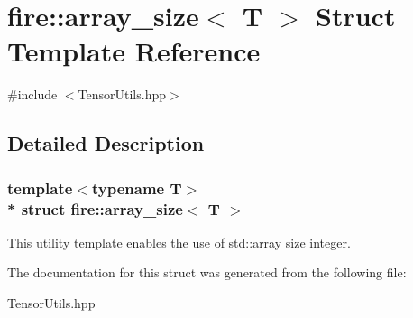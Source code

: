 \hypertarget{a00035}{}\section{fire\+:\+:array\+\_\+size$<$ T $>$ Struct Template Reference}
\label{a00035}


{\ttfamily \#include $<$Tensor\+Utils.\+hpp$>$}



\subsection{Detailed Description}
\subsubsection*{template$<$typename T$>$\\*
struct fire\+::array\+\_\+size$<$ T $>$}

This utility template enables the use of std\+::array size integer. 

The documentation for this struct was generated from the following file\+:\begin{DoxyCompactItemize}
\item 
Tensor\+Utils.\+hpp\end{DoxyCompactItemize}

